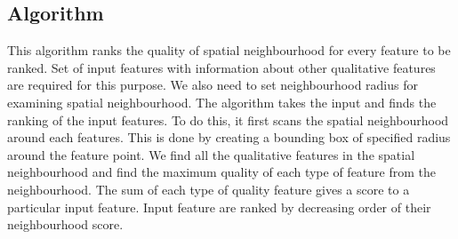 \subsection{Algorithm}
This algorithm ranks the quality of spatial neighbourhood for every feature to be ranked. Set of input features with information about other qualitative features are required for this purpose. We also need to set neighbourhood radius for examining spatial neighbourhood. The algorithm takes the input and finds the ranking of the input features. To do this, it first scans the spatial neighbourhood around each features. This is done by creating a bounding box of specified radius around the feature point. We find all the qualitative features in the spatial neighbourhood and find the maximum quality of each type of feature from the neighbourhood. The sum of each type of quality feature gives a score to a particular input feature. Input feature are ranked by decreasing order of their neighbourhood score.
\newline
{}

